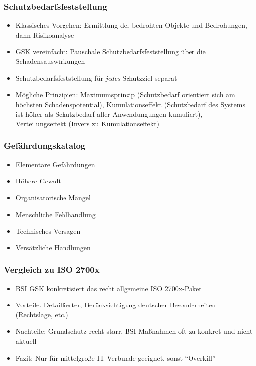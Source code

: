 \subsubsection{Schutzbedarfsfeststellung}
\begin{itemize}
	\item Klassisches Vorgehen: Ermittlung der bedrohten Objekte und Bedrohungen, dann Risikoanalyse
	\item GSK vereinfacht: Pauschale Schutzbedarfsfeststellung über die Schadensauswirkungen
	\item Schutzbedarfsfeststellung für \textit{jedes} Schutzziel separat
	\item Mögliche Prinzipien: Maximumsprinzip (Schutzbedarf orientiert sich am höchsten Schadenspotential), Kumulationseffekt (Schutzbedarf des Systems ist höher als Schutzbedarf aller Anwendungungen kumuliert), Verteilungseffekt (Invers zu Kumulationseffekt)
\end{itemize}

\subsubsection{Gefährdungskatalog}
\begin{itemize}
	\item Elementare Gefährdungen
	\item Höhere Gewalt
	\item Organisatorische Mängel
	\item Menschliche Fehlhandlung
	\item Technisches Versagen
	\item Versätzliche Handlungen
\end{itemize}

\subsubsection{Vergleich zu ISO 2700x}
\begin{itemize}
	\item BSI GSK konkretisiert das recht allgemeine ISO 2700x-Paket
	\item Vorteile: Detaillierter, Berücksichtigung deutscher Besonderheiten (Rechtslage, etc.)
	\item Nachteile: Grundschutz recht starr, BSI Maßnahmen oft zu konkret und nicht aktuell
	\item Fazit: Nur für mittelgroße IT-Verbunde geeignet, sonst "`Overkill"'
\end{itemize}



